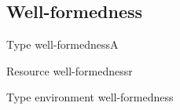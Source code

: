 \subsection{\corelang{} Well-formedness}

\begin{rules}{Type well-formedness}{\vdash A}
    \begin{minipage}{.20\linewidth}
    \end{minipage}
    \begin{minipage}{.35\linewidth}
    \end{minipage}
    \begin{minipage}{.30\linewidth}
    \end{minipage}
\end{rules}


\begin{rules}{Resource well-formedness}{\vdash r}
    \begin{minipage}{.2\linewidth}
        \infrule[Rw$_\bot$]{
             \\
        }{
            \vdash \bot
        }
    \end{minipage}
    \begin{minipage}{.30\linewidth}
    \end{minipage}
\end{rules}

\begin{rules}{Type environment well-formedness}{\vdash \Gamma}
    \begin{minipage}{.25\linewidth}
    \end{minipage}
    \begin{minipage}{.50\linewidth}
    \end{minipage}
    \begin{minipage}{.6\linewidth}
    \end{minipage}
\end{rules}

